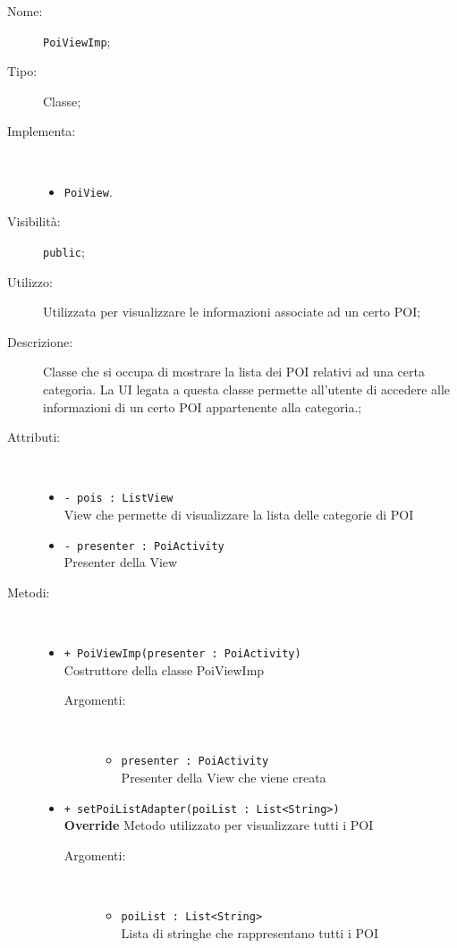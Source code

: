 \documentclass[../DefinizioneDiProdotto.tex]{subfiles}
\begin{document}
\begin{description}
	\item[Nome:] \texttt{PoiViewImp};
	\item[Tipo:] Classe;
	\item[Implementa:] \
	\begin{itemize}
		\item \texttt{PoiView}.
		
	\end{itemize}
	\item[Visibilità:] \texttt{public};
	\item[Utilizzo:] Utilizzata per visualizzare le informazioni associate ad un certo POI;
	\item[Descrizione:] Classe che si occupa di mostrare la lista dei POI relativi ad una certa categoria. La UI legata a questa classe permette all'utente di accedere alle informazioni di un certo POI appartenente alla categoria.;
	\item[Attributi:] \
	\begin{itemize}
		\item \texttt{- pois : ListView}\\
		View che permette di visualizzare la lista delle categorie di POI
		
		\item \texttt{- presenter : PoiActivity}\\
		Presenter della View
		
	\end{itemize}
	\item[Metodi:] \
	\begin{itemize}
		\item \texttt{+ PoiViewImp(presenter : PoiActivity)}\\
		Costruttore della classe PoiViewImp
		\begin{description}
			\item[Argomenti:] \
			\begin{itemize}
				\item \texttt{presenter : PoiActivity}\\
				Presenter della View che viene creata\end{itemize}
		\end{description}
		\item \texttt{+ setPoiListAdapter(poiList : List<String>)}\\
		\textbf{Override} Metodo utilizzato per visualizzare tutti i POI
		\begin{description}
			\item[Argomenti:] \
			\begin{itemize}
				\item \texttt{poiList : List<String>}\\
				Lista di stringhe che rappresentano tutti i POI\end{itemize}
		\end{description}
	\end{itemize}
\end{description}
\end{document}
